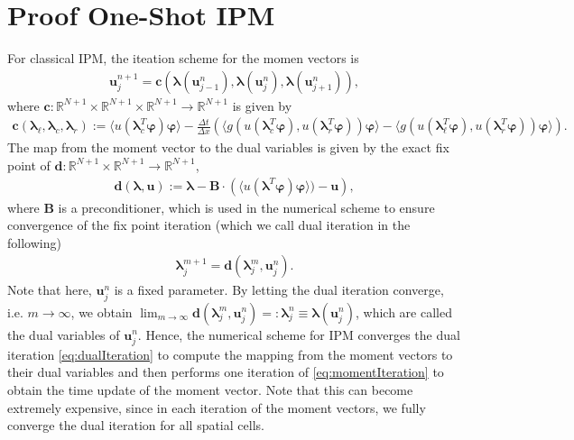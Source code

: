 \documentclass[10pt, a4paper, titlepage, bibliography=totocnumbered]{article}
\begin{document}
\section*{Proof One-Shot IPM}
For classical IPM, the iteation scheme for the momen vectors is
\begin{align}\label{eq:momentIteration}
\bm{u}_j^{n+1} = \bm{c}\left(\bm{\lambda}(\bm{u}_{j-1}^n),\bm{\lambda}(\bm{u}_{j}^n),\bm{\lambda}(\bm{u}_{j+1}^n)\right),
\end{align}
where $\bm{c}:\mathbb{R}^{N+1}\times\mathbb{R}^{N+1}\times\mathbb{R}^{N+1}\to\mathbb{R}^{N+1}$ is given by
\begin{align*}
\bm{c}\left(\bm{\lambda}_{\ell},\bm{\lambda}_c,\bm{\lambda}_r\right):= \langle u(\bm{\lambda}_c^T\bm{\varphi})\bm{\varphi}\rangle - \frac{\Delta t}{\Delta x}\left(\langle g(u(\bm{\lambda}_c^T\bm{\varphi}),u(\bm{\lambda}_r^T\bm{\varphi}))\bm{\varphi}\rangle-\langle g(u(\bm{\lambda}_{\ell}^T\bm{\varphi}),u(\bm{\lambda}_r^T\bm{\varphi}))\bm{\varphi}\rangle\right).
\end{align*}
The map from the moment vector to the dual variables is given by the exact fix point of $\bm{d}:\mathbb{R}^{N+1}\times\mathbb{R}^{N+1}\to\mathbb{R}^{N+1}$,
\begin{align*}
\bm{d}(\bm{\lambda},\bm{u}):= \bm{\lambda}-\bm{B}\cdot \left(\langle u(\bm{\lambda}^T\bm{\varphi})\bm{\varphi}\rangle)-\bm{u}\right),
\end{align*}
where $\bm{B}$ is a preconditioner, which is used in the numerical scheme to ensure convergence of the fix point iteration (which we call dual iteration in the following)
\begin{align}\label{eq:dualIteration}
\bm{\lambda}_j^{m+1} = \bm{d}(\bm{\lambda}_j^m,\bm{u}_j^{n}).
\end{align}
Note that here, $\bm{u}_j^{n}$ is a fixed parameter. By letting the dual iteration converge, i.e. $m\rightarrow\infty$, we obtain $\lim_{m\rightarrow\infty}\bm{d}(\bm{\lambda}_j^m,\bm{u}_j^{n}) =:\bm{\lambda}_j^{n} \equiv \bm\lambda(\bm{u}_j^{n})$, which are called the dual variables of $\bm{u}_j^{n}$. Hence, the numerical scheme for IPM converges the dual iteration \eqref{eq:dualIteration} to compute the mapping from the moment vectors to their dual variables and then performs one iteration of \eqref{eq:momentIteration} to obtain the time update of the moment vector. Note that this can become extremely expensive, since in each iteration of the moment vectors, we fully converge the dual iteration for all spatial cells.
\end{document}
